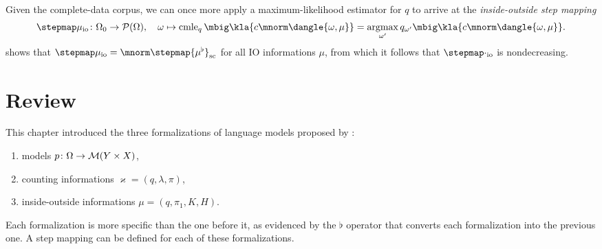 \clearpage

Given the complete-data corpus, we can once more apply a maximum-likelihood
estimator for $q$ to arrive at the \emph{inside-outside step mapping}
\[
 \stepmap\mu_\mathrm{io}\colon \Omega_0 \to \up(\Omega), \quad
 \omega \mapsto \cmle_q\mbig\kla{c\mnorm\dangle{\omega,\mu}} = \argmax_{\omega'} q_{\omega'}\mbig\kla{c\mnorm\dangle{\omega,\mu}}.
\]
\cite[pp.~16]{bucstuvog15} shows that $\stepmap\mu_\mathrm{io} =
\mnorm\stepmap{\mu^\flat}_\mathrm{sc}$ for all IO informations $\mu$, from
which it follows that $\stepmap\cdot_\mathrm{io}$ is nondecreasing.

\section{Review}

This chapter introduced the three formalizations of language models
proposed by \cite{bucstuvog15}:
\begin{enumerate}\setlength\itemsep{-0.3em}
 \item models $p\colon\Omega\to\mathcal M(Y\times X)$,
 \item counting informations $\varkappa=(q,\lambda,\pi)$,
 \item inside-outside informations $\mu=(q,\pi_1,K,H)$.
\end{enumerate}
Each formalization is more specific than the one before it, as evidenced by the
$\flat$ operator that converts each formalization into the previous one.
A step mapping can be defined for each of these formalizations.
\begin{center}\end{center}

